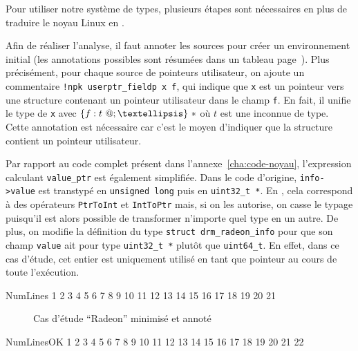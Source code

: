 Pour utiliser notre système de types, plusieurs étapes sont nécessaires en plus
de traduire le noyau Linux en \newspeak{}.

Afin de réaliser l'analyse, il faut annoter les sources pour créer un
environnement initial (les annotations possibles sont résumées dans un tableau
page~\pageref{page:tab-anns}). Plus précisément, pour chaque source de pointeurs
utilisateur, on ajoute un commentaire \texttt{!npk userptr\_fieldp x f}, qui
indique que \texttt{x} est un pointeur vers une structure contenant un pointeur
utilisateur dans le champ \texttt{f}. En fait, il unifie le type de \texttt{x}
avec $\{ f: \ptrU{t} ; … \}~*$ où $t$ est une inconnue de type. Cette annotation
est nécessaire car c'est le moyen d'indiquer que la structure contient un
pointeur utilisateur.

Par rapport au code complet présent dans l'annexe~\ref{cha:code-noyau},
l'expression calculant \texttt{value_ptr} est également simplifiée. Dans le code
d'origine, \texttt{info->value} est transtypé en \texttt{unsigned long} puis en
\texttt{uint32\_t *}. En \newspeak, cela correspond à des opérateurs
\texttt{PtrToInt} \linebreak et \texttt{IntToPtr} mais, si on les autorise, on
casse le typage puisqu'il est alors possible de transformer n'importe quel type
en un autre. De plus, on modifie la définition du type \texttt{struct
drm\_radeon\_info} pour que son champ \texttt{value} ait pour type
\texttt{uint32\_t *} plutôt que \texttt{uint64\_t}. En effet, dans ce cas
d'étude, cet entier est uniquement utilisé en tant que pointeur au cours de
toute l'exécution.

\begin{SaveVerbatim}{NumLines}
 1
 2
 3
 4
 5
 6
 7
 8
 9
10
11
12
13
14
15
16
17
18
19
20
21
\end{SaveVerbatim}

\begin{figure}[p]
\begin{minipage}{1cm}
\end{minipage}
\begin{minipage}{0.93\linewidth}
\end{minipage}

\caption{Cas d'étude \enquote{Radeon} minimisé et annoté}
\label{fig:ex-drm}
\end{figure}

\begin{SaveVerbatim}{NumLinesOK}
 1
 2
 3
 4
 5
 6
 7
 8
 9
10
11
12
13
14
15
16
17
18
19
20
21
22
\end{SaveVerbatim}

